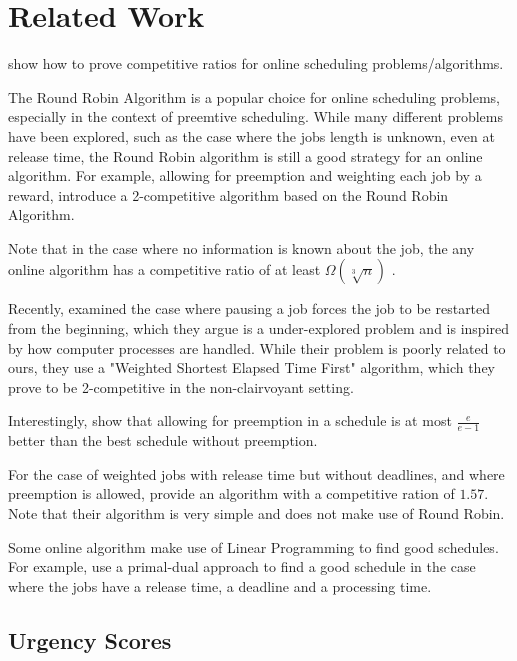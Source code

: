 \section{Related Work}

\citet{calinescu2024online} show how to prove competitive ratios for online scheduling problems/algorithms.

The Round Robin Algorithm \citep{kleinrock1964analysis} is a popular choice for online scheduling problems, especially in the context of preemtive scheduling. 
While many different problems have been explored, such as the case where the jobs length is unknown, even at release time, the Round Robin algorithm is still a good strategy for an online algorithm. For example, allowing for preemption and weighting each job by a reward, \citet{kim2003non} introduce a 2-competitive algorithm based on the Round Robin Algorithm.  

Note that in the case where no information is known about the job, the any online algorithm has a competitive ratio of at least $\Omega\left(\sqrt[3]{n}\right)$ \citep{motwani1994nonclairvoyant}.

Recently, \citet{jager2025competitive} examined the case where pausing a job forces the job to be restarted from the beginning, which they argue is a under-explored problem and is inspired by how computer processes are handled. While their problem is poorly related to ours, they use a "Weighted Shortest Elapsed Time First" algorithm, which they prove to be 2-competitive in the non-clairvoyant setting.

Interestingly, \citet{epstein2016benefit} show that allowing for preemption in a schedule is at most $\frac{e}{e-1}$ better than the best schedule without preemption.

For the case of weighted jobs with release time but without deadlines, and where preemption is allowed, \citet{sitters2010competitive} provide an algorithm with a competitive ration of $1.57$. Note that their algorithm is very simple and does not make use of Round Robin.

Some online algorithm make use of Linear Programming to find good schedules. For example, \citet{keyvanshokooh2021online} use a primal-dual approach to find a good schedule in the case where the jobs have a release time, a deadline and a processing time.

\subsection{Urgency Scores}
\label{sec:urgency_scores}

